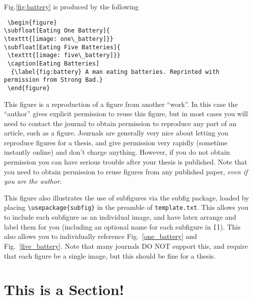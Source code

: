 
Fig.\ref{fig:battery} is produced by the following
\begin{verbatim}
 \begin{figure}
\subfloat[Eating One Battery]{
\texttt{[image: one\_battery]}}
\subfloat[Eating Five Batteries]{
 \texttt{[image: five\_battery]}}
 \caption[Eating Batteries]
  {\label{fig:battery} A man eating batteries. Reprinted with permission from Strong Bad.}
 \end{figure}
\end{verbatim}
This figure is a reproduction of a figure from another ``work''.  
In this case the ``author'' gives explicit permission to reuse this figure,
but in most cases you will need to contact the journal to obtain permission to 
reproduce any part of an article, such as a figure.  
Journals are generally very nice about letting you reproduce figures 
for a thesis, and give permission very rapidly (sometime instantly online)
and don't charge anything.  However, if you do not obtain permission
you can have serious trouble after your thesis is published.
Note that you need to obtain permission to reuse figures
from any published paper, 
\textit{even if you are the author.} 

This figure also illustrates the use of subfigures via the subfig package, loaded by placing 
\verb#\usepackage{subfig}# in the preamble of \verb#template.txt#.  This allows you to include
each subfigure as an individual image, and have latex arrange and label them for you 
(including an optional name for each subfigure in \verb#[]#).  This also allows
you to individually reference Fig.~\ref{one_battery} and Fig.~\ref{five_battery}.
Note that many journals DO NOT support this, and require that each figure be a single
image, but this should be fine for a thesis.  


\section{This is a Section!}

\lipsum[2-4]
